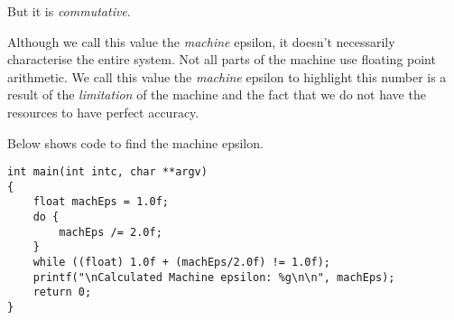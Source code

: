 But it is \textit{commutative}. 



Although we call this value the \textit{machine} epsilon, 
it doesn't necessarily characterise the entire system. 
Not all parts of the machine use floating point arithmetic. 
We call this value the \textit{machine} epsilon 
to highlight this number is a result of the \textit{limitation} of the machine 
and the fact that we do not have the resources to have perfect accuracy.  


Below shows code to find the machine epsilon. 

\begin{lstlisting}
int main(int intc, char **argv) 
{
    float machEps = 1.0f;
    do {
        machEps /= 2.0f;
    }
    while ((float) 1.0f + (machEps/2.0f) != 1.0f);
    printf("\nCalculated Machine epsilon: %g\n\n", machEps); 
    return 0;
}
\end{lstlisting}